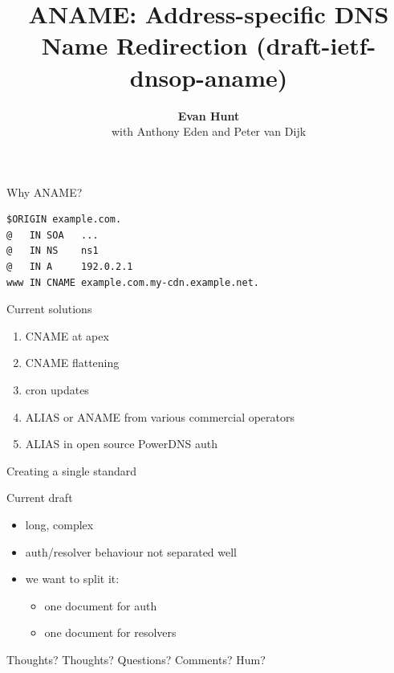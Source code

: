\documentclass{beamer}
\title[aname]{ANAME: Address-specific DNS Name Redirection (draft-ietf-dnsop-aname)}
\author{\textbf{Evan Hunt}\\with Anthony Eden and Peter van Dijk}
\date{}
\begin{document}
\begin{frame}
  \titlepage
\end{frame}

\begin{frame}[fragile]{Why ANAME?}
  \begin{verbatim}
$ORIGIN example.com.
@   IN SOA   ...
@   IN NS    ns1
@   IN A     192.0.2.1
www IN CNAME example.com.my-cdn.example.net.
  \end{verbatim}
\end{frame}

\begin{frame}{Current solutions}
  \begin{enumerate}
    \item CNAME at apex
    \item CNAME flattening
    \item cron updates
    \item ALIAS or ANAME from various commercial operators
    \item ALIAS in open source PowerDNS auth
  \end{enumerate}
\end{frame}

\begin{frame}{Creating a single standard}
\end{frame}

\begin{frame}{Current draft}
  \begin{itemize}
    \item long, complex
    \item auth/resolver behaviour not separated well
    \item we want to split it:
    \begin{itemize}
      \item one document for auth
      \item one document for resolvers
    \end{itemize}
  \end{itemize}
\end{frame}

\begin{frame}{Thoughts?}
Thoughts? Questions? Comments?
\newline
\newline
\newline
Hum?

\end{frame}
\end{document}
